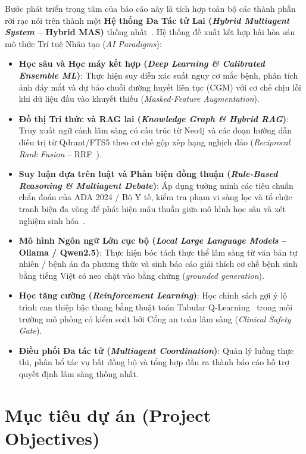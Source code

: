 Bước phát triển trọng tâm của báo cáo này là tích hợp toàn bộ các thành phần rời rạc nói trên thành một \textbf{Hệ thống Đa Tác tử Lai (\emph{Hybrid Multiagent System} -- Hybrid MAS)} thống nhất~\cite{wooldridge2009,guo2024mas}. Hệ thống đề xuất kết hợp hài hòa sáu mô thức Trí tuệ Nhân tạo (\emph{AI Paradigms}):
\begin{itemize}
  \item \textbf{Học sâu và Học máy kết hợp (\emph{Deep Learning \& Calibrated Ensemble ML})}: Thực hiện suy diễn xác suất nguy cơ mắc bệnh, phân tích ảnh đáy mắt và dự báo chuỗi đường huyết liên tục (CGM) với cơ chế chịu lỗi khi dữ liệu đầu vào khuyết thiếu (\emph{Masked-Feature Augmentation}).
  \item \textbf{Đồ thị Tri thức và RAG lai (\emph{Knowledge Graph \& Hybrid RAG})}: Truy xuất ngữ cảnh lâm sàng có cấu trúc từ Neo4j và các đoạn hướng dẫn điều trị từ Qdrant/FTS5 theo cơ chế gộp xếp hạng nghịch đảo (\emph{Reciprocal Rank Fusion} -- RRF~\cite{cormack2009}).
  \item \textbf{Suy luận dựa trên luật và Phản biện đồng thuận (\emph{Rule-Based Reasoning \& Multiagent Debate})}: Áp dụng tường minh các tiêu chuẩn chẩn đoán của ADA 2024 / Bộ Y tế, kiểm tra phạm vi sàng lọc và tổ chức tranh biện đa vòng để phát hiện mâu thuẫn giữa mô hình học sâu và xét nghiệm sinh hóa~\cite{du2024debate}.
  \item \textbf{Mô hình Ngôn ngữ Lớn cục bộ (\emph{Local Large Language Models} -- Ollama / Qwen2.5)}: Thực hiện bóc tách thực thể lâm sàng từ văn bản tự nhiên / bệnh án đa phương thức và sinh báo cáo giải thích cơ chế bệnh sinh bằng tiếng Việt có neo chặt vào bằng chứng (\emph{grounded generation}).
  \item \textbf{Học tăng cường (\emph{Reinforcement Learning})}: Học chính sách gợi ý lộ trình can thiệp bậc thang bằng thuật toán Tabular Q-Learning~\cite{watkins1992,sutton2018} trong môi trường mô phỏng có kiểm soát bởi Cổng an toàn lâm sàng (\emph{Clinical Safety Gate}).
  \item \textbf{Điều phối Đa tác tử (\emph{Multiagent Coordination})}: Quản lý luồng thực thi, phân bổ tác vụ bất đồng bộ và tổng hợp đầu ra thành báo cáo hỗ trợ quyết định lâm sàng thống nhất.
\end{itemize}

\section{Mục tiêu dự án (Project Objectives)}
\label{sec:project-objectives}

